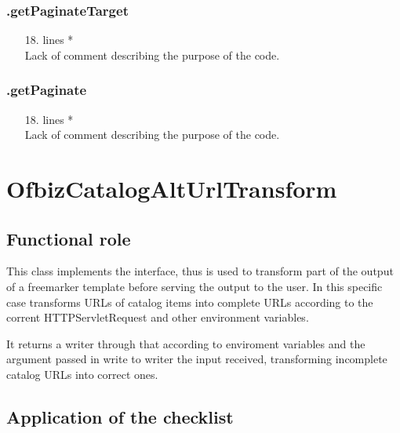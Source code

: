\documentclass[english]{article}
\begin{document}
\subsubsection*{.getPaginateTarget}
\begin{itemize}
\item[18.]{lines  *\\
		Lack of comment describing the purpose of the code.}
\end{itemize}
\subsubsection*{.getPaginate}
\begin{itemize}
\item[18.]{lines  *\\
		Lack of comment describing the purpose of the code.}
\end{itemize}


\section{OfbizCatalogAltUrlTransform}
	\subsection{Functional role}
	
	This class implements the  interface, thus is used to transform part of the output of a freemarker template before serving the output to the user. In this specific case transforms URLs of catalog items into complete URLs according to the corrent HTTPServletRequest and other environment variables. 
	\par It returns a writer through  that according to enviroment variables and the argument passed in  write to writer  the input received, transforming incomplete catalog URLs into correct ones.
	
	\subsection{Application of the checklist}
\end{document}
